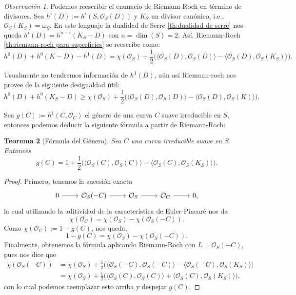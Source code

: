 \documentclass[spanish,12pt]{amsart}
\newtheorem{theorem}{Teorema}[section]
\theoremstyle{definition}
\theoremstyle{remark}
\newtheorem{remark}[theorem]{Observación}
\numberwithin{equation}{section}
\renewcommand{\O}{\mathcal{O}}
\begin{document}
\begin{remark}
Podemos reescribir el enunacio de Riemann-Roch en término de divisores. Sea $h^i (D) := h^i(S, \O_S (D))$ y $K_S$ un divisor canónico, i.e., $\O_S (K_S) = \omega_S$. En este lenguaje la dualidad de Serre \ref{th:dualidad de serre} nos queda $h^i (D) = h^{n-i} (K_S - D)$ con $n = \dim (S) = 2$. Así, Riemann-Roch \ref{th:riemann-roch para superficies} se reescribe como:
\[
    h^0 (D) + h^0 (K-D) - h^1 (D) = \chi (\O_S) + \frac 1 2 \big ( \langle \O_S (D), \O_S (D) \rangle - \langle \O_S (D), \O_S (K_S) \rangle \big ).
\]

Usualmente no tendremos información de $h^1 (D)$, aún así Riemann-roch nos provee de la siguiente desigualdad útil:
\[
    h^0 (D) + h^0 (K_S - D) \geq \chi (\O_S) + \frac 1 2 \big ( \langle \O_S (D), \O_S (D) \rangle  - \langle  \O_S (D), \O_S (K)\rangle  \big ).
\]
\end{remark}

\bigskip

Sea $g(C) := h^1 (C, \O_C)$ el género de una curva $C$ suave irreducible en $S$, entonces podemos deducir la siguiente fórmula a partir de Riemann-Roch:
\begin{theorem}[Fórmula del Género]\label{th:formula del genero}
Sea $C$ una curva irreducible suave en $S$. Entonces
\[
    g(C) = 1 + \frac 1 2 \big ( \langle \O_S (C), \O_S (C) \rangle  - \langle \O_S (C), \O_S (K_S) \rangle  \big ).
\]
\end{theorem}
\begin{proof}
Primero, tenemos la sucesión exacta
\[
    \begin{tikzcd}
    0 \ar{r} & \O_S (-C) \ar{r} & \O_S \ar{r} & \O_C \ar{r} & 0,
    \end{tikzcd}
\]
la cual utilizando la aditividad de la característica de Euler-Pincaré nos da
\[
    \chi (\O_C) = \chi (\O_S) - \chi (\O_S (-C)).
\]
Como $ \chi (\O_C ) := 1 - g(C)$, nos queda,
\[
    1 - g(C) = \chi (\O_S) - \chi (\O_S (-C)).
\]
Finalmente, obtenemos la fórmula aplicando Riemann-Roch con $L = \O_S (-C)$, pues nos dice que
\begin{align*}
    \chi (\O_S (-C)) &= \chi (\O_S) + \frac 1 2 \big ( \langle \O_S (-C), \O_S (-C) \rangle - \langle \O_S (-C), \O_S (K_S) \rangle \big) \\
    &= \chi (\O_S) + \frac 1 2 \big ( \langle \O _S (C), \O_S (C)\rangle + \langle \O_S (C), \O_S (K_S) \rangle  \big ),
\end{align*}
con lo cual podemos reemplazar esto arriba y despejar $g(C)$.
\end{proof}
\end{document}
